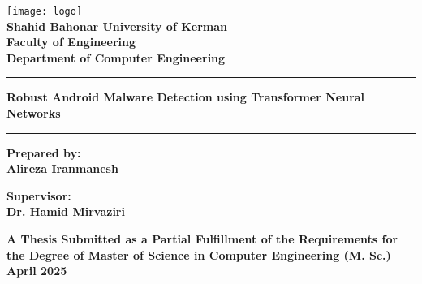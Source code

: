 

\setlength{\parindent}{0pt}
\begin{center}
\texttt{[image: logo]} \\
{\fontsize{14}{15}\selectfont \textbf{Shahid Bahonar University of Kerman}} \\
{\fontsize{14}{15}\selectfont\textbf{Faculty of  Engineering }} \\
{\fontsize{14}{15}\selectfont\textbf{Department of Computer Engineering}} \\
\vskip 1cm
\hrule height 2pt
\par
\begin{center}
\fontsize{16}{17}\bfseries\selectfont
Robust Android Malware Detection using Transformer Neural Networks
\end{center}
\par
\hrule height 2pt
\par
\vskip 2cm
{\fontsize{16}{17}\selectfont \bfseries
	 Prepared by:}
\\
{\fontsize{14}{15}\selectfont \bfseries
	Alireza Iranmanesh}
	 \par \vskip 1cm
{\fontsize{16}{17}\selectfont \bfseries
	 Supervisor:}
	 \\
{\fontsize{14}{15}\selectfont \bfseries
	 Dr. Hamid Mirvaziri}



 \vskip 1cm
{\fontsize{14}{15}\selectfont \bfseries
A Thesis Submitted as a Partial Fulfillment of the Requirements for the Degree of Master of Science in Computer Engineering (M. Sc.)}
\vskip15mm
{\fontsize{14}{15}\selectfont \bfseries
April 2025}
\end{center} 
